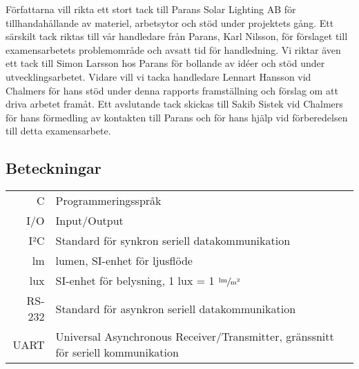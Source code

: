     Författarna vill rikta ett stort tack till Parans Solar Lighting AB för tillhandahållande av materiel, arbetsytor och stöd under projektets gång. Ett särskilt tack riktas till vår handledare från Parans, Karl Nilsson, för förslaget till examensarbetets problemområde och avsatt tid för handledning. Vi riktar även ett tack till Simon Larsson hos Parans för bollande av idéer och stöd under utvecklingsarbetet. Vidare vill vi tacka handledare Lennart Hansson vid Chalmers för hans stöd under denna rapports framställning och förslag om att driva arbetet framåt. Ett avslutande tack skickas till Sakib Sistek vid Chalmers för hans förmedling av kontakten till Parans och för hans hjälp vid förberedelsen till detta examensarbete.


\newpage

\subsection*{Beteckningar} %
\label{sub:beteckningar}
    \begin{tabularx}{\textwidth}{@{}rX}
        C & Programmeringsspråk \\
        I/O & Input/Output \\
        I²C & Standard för synkron seriell datakommunikation \\
        lm & lumen, SI-enhet för ljusflöde \\
        lux & SI-enhet för belysning, 1 lux = 1 $\sfrac{\text{lm}}{\text{m}^2}$ \\
        RS-232 & Standard för asynkron seriell datakommunikation \\
        UART & Universal Asynchronous Receiver/Transmitter, gränssnitt för seriell kommunikation
        
    \end{tabularx}
